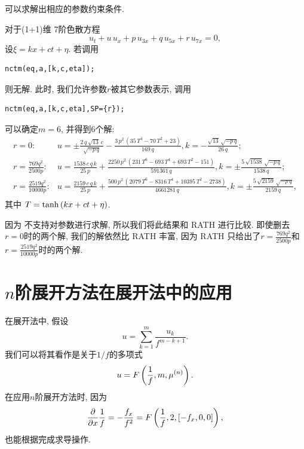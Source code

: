 \begin{example}可以求解出相应的参数约束条件. 

对于(1+1)维 7阶色散方程\cite{duffy1996travelling}
\begin{equation}
    {{u}_{t}}+u\,{{u}_{x}}+p\,{{u}_{3x}}+q\,{{u}_{5x}}+r\,{{u}_{7x}}=0,
\end{equation}
设$\xi=kx+ct+\eta$. 若调用
\begin{verbatim}
nctm(eq,a,[k,c,eta]);
\end{verbatim}
则无解. 此时, 我们允许参数$r$被其它参数表示, 调用
\begin{verbatim}
nctm(eq,a,[k,c,eta],SP={r});
\end{verbatim}
可以确定$m=6$, 并得到6个解:
\begin{equation}
\renewcommand{\arraystretch}{1.4}
\begin{array}{rl}
r=0:& u=\pm \frac{2\,q\,\sqrt {13}\,c}{\sqrt {-p\,q}}-\frac{3\,{p}^{2}\,\left( 35\,{T}^{4}-70\,{T}^{2}+23\right) }{169\,q},k=-\frac{\sqrt {13}\,\sqrt {-p\,q}}{26\,q};\\
r=\frac{769 q^2}{2500 p}:& u=\frac{1538\,c\,q\,k}{25\,p}+\frac{2250\,{p}^{2}\,\left( 231\,{T}^{6}-693\,{T}^{4}+693\,{T}^{2}-151\right) }{591361\,q},k=\pm \frac{5\,\sqrt {1538}\,\sqrt {-p\,q}}{1538\,q};\\
r=\frac{2519 q^2}{10000 p}:& u=\frac{2159\,c\,q\,k}{25\,p}+\frac{500\,{p}^{2}\,\left( 2079\,{T}^{6}-8316\,{T}^{4}+10395\,{T}^{2}-2738\right) }{4661281\,q},k=\pm\frac{5\,\sqrt {2159}\,\sqrt {-p\,q}}{2159\,q}, \\
\end{array}
\end{equation}
其中 $T=\tanh\left(kx+ct+\eta\right)$. 

因为 不支持对参数进行求解, 所以我们将此结果和 RATH 进行比较. 即使删去$r=0$时的两个解, 我们的解依然比 RATH\cite[p21]{liu2001master} 丰富, 因为 RATH 只给出了$r=\frac{769 q^2}{2500 p}$和$r=\frac{2519 q^2}{10000 p}$时的两个解. 
\end{example}

\section{$n$阶展开方法在\Painleve{}展开法中的应用}\label{ch4sec6}
在\Painleve{}展开法中, 假设 
\begin{equation}
    u=\sum_{k=1}^{m}\frac{u_k}{f^{m-k+1}}. \label{TPE-pkg}
\end{equation}
我们可以将其看作是关于$1/f$的多项式
\begin{equation}
    u=F\left(\frac{1}{f},m,\mu^{(n)}\right).
\end{equation}
在应用$n$阶展开方法时, 因为 
\begin{equation}
    \frac{\partial}{\partial x}{\frac{1}{f}}=-\frac{f_x}{f^2}=F\left(\frac{1}{f},2,\left[-f_x,0,0\right]\right),
\end{equation}
也能根据完成求导操作. 

